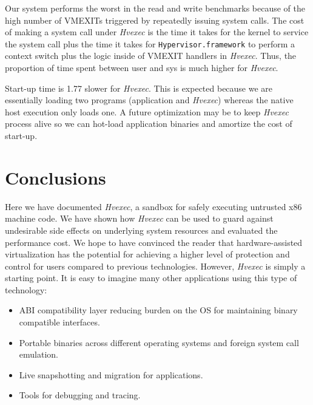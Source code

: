 \documentclass{article}
\newcommand{\PROJNAME}{\textit{Hvexec}}
\begin{document}
Our system performs the worst in the read and write benchmarks because of the high number of VMEXITs triggered by repeatedly issuing system calls.
The cost of making a system call under \PROJNAME{} is the time it takes for the kernel to service the system call plus the time it takes for \texttt{Hypervisor.framework} to perform a context switch plus the logic inside of VMEXIT handlers in \PROJNAME{}.
Thus, the proportion of time spent between user and sys is much higher for \PROJNAME{}.

Start-up time is 1.77 slower for \PROJNAME{}.
This is expected because we are essentially loading two programs (application and \PROJNAME{}) whereas the native host execution only loads one. A future optimization may be to keep \PROJNAME{} process alive so we can hot-load application binaries and amortize the cost of start-up.

\section{Conclusions}
Here we have documented \PROJNAME{}, a sandbox for safely executing untrusted x86 machine code.
We have shown how \PROJNAME{} can be used to guard against undesirable side effects on underlying system resources and evaluated the performance cost.
We hope to have convinced the reader that hardware-assisted virtualization has the potential for achieving a higher level of protection and control for users compared to previous technologies. However, \PROJNAME{} is simply a starting point. It is easy to imagine many other applications using this type of technology:

\begin{itemize}
    \item
        ABI compatibility layer reducing burden on the OS for maintaining binary compatible interfaces.
    \item
        Portable binaries across different operating systems and foreign system call emulation.
    \item
        Live snapshotting and migration for applications.
    \item
        Tools for debugging and tracing.
\end{itemize}
\end{document}

